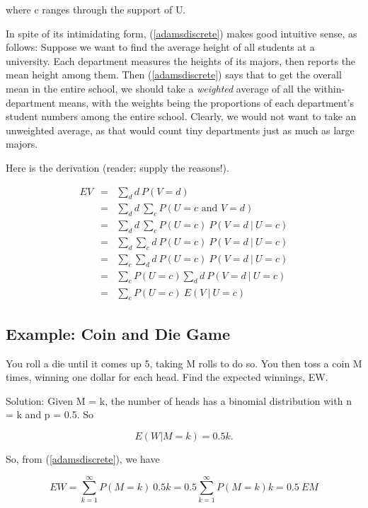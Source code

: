 where c ranges through the support of U.

In spite of its intimidating form, (\ref{adamsdiscrete}) makes good
intuitive sense, as follows:  Suppose we want to find the average height
of all students at a university.  Each department measures the heights
of its majors, then reports the mean height among them.  Then
(\ref{adamsdiscrete}) says that to get the overall mean in the entire
school, we should take a {\it weighted} average of all the
within-department means, with the weights being the proportions of each
department's student numbers among the entire school.  Clearly, we would
not want to take an unweighted average, as that would count tiny
departments just as much as large majors.

Here is the derivation (reader:  supply the reasons!).

\begin{eqnarray}
EV &=& \sum_{d} d ~ P(V = d) \\ 
   &=& \sum_{d} d ~ \sum_{c} P(U = c \textrm{ and } V = d) \\ 
   &=& \sum_{d} d ~ \sum_{c} P(U = c) ~ P(V = d ~|~ U = c) \\ 
   &=& \sum_{d} \sum_{c} d ~P(U = c) ~ P(V = d ~|~ U = c) \\ 
   &=& \sum_{c} \sum_{d} d ~P(U = c) ~ P(V = d ~|~ U = c) \\ 
   &=& \sum_{c} P(U = c) \sum_{d} d ~ P(V = d ~|~ U = c) \\ 
   &=& \sum_c P(U = c) ~ E(V ~|~ U = c) 
\end{eqnarray}

\subsection{Example:  Coin and Die Game}

You roll a die until it comes up 5, taking M rolls to do so.  You then
toss a coin M times, winning one dollar for each head.  Find the
expected winnings, EW.

Solution:  Given M = k, the number of heads has a binomial distribution
with n = k and p = 0.5.  So

\begin{equation}
E(W | M = k) = 0.5 k.
\end{equation}

So, from (\ref{adamsdiscrete}), we have

\begin{equation}
EW = \sum_{k=1}^\infty P(M = k) ~ 0.5 k 
= 0.5 \sum_{k=1}^\infty P(M = k) k
= 0.5 ~ EM
\end{equation}

